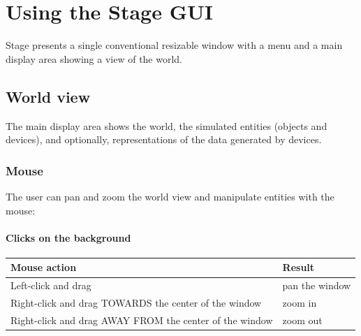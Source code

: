 \documentclass[11pt,twoside]{report}
\begin{document}






\chapter{Using the Stage GUI}

Stage presents a single conventional resizable window with a menu and
a main display area showing a view of the world.

\section{World view}
The main display area shows the world, the simulated entities (objects
and devices), and optionally, representations of the data generated
by devices. 

\subsection{Mouse}
The user can pan and zoom the world view and manipulate entities with
the mouse:

\subsubsection*{Clicks on the background}

\begin{tabular}{|l|l|}
\hline Mouse action & Result\\\hline
Left-click and drag & pan the window\\
Right-click and drag TOWARDS the center of the window & zoom in\\
Right-click and drag AWAY FROM the center of the window & zoom out\\ 
\hline
\end{tabular}
\end{document}
